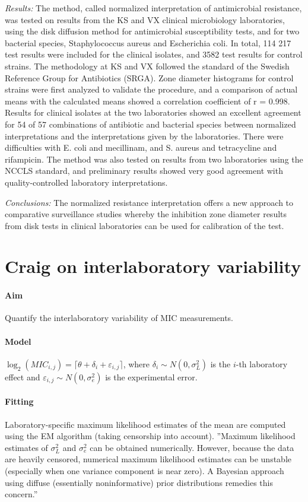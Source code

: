 \documentclass[a4paper]{article}
\begin{document}
\emph{Results:} The method, called normalized interpretation of antimicrobial resistance, was tested on results from the KS and VX clinical microbiology laboratories, using the disk diffusion method for antimicrobial susceptibility tests, and for two bacterial species, Staphylococcus aureus and Escherichia coli. In total, 114 217 test results were included for the clinical isolates, and 3582 test results for control strains. The methodology at KS and VX followed the standard of the Swedish Reference Group for Antibiotics (SRGA). Zone diameter histograms for control strains were first analyzed to validate the procedure, and a comparison of actual means with the calculated means showed a correlation coefficient of r = 0.998. Results for clinical isolates at the two laboratories showed an excellent agreement for 54 of 57 combinations of antibiotic and bacterial species between normalized interpretations and the interpretations given by the laboratories. There were difficulties with E. coli and mecillinam, and S. aureus and tetracycline and rifampicin. The method was also tested on results from two laboratories using the NCCLS standard, and preliminary results showed very good agreement with quality-controlled laboratory interpretations.

\emph{Conclusions:} The normalized resistance interpretation offers a new approach to comparative surveillance studies whereby the inhibition zone diameter results from disk tests in clinical laboratories can be used for calibration of the test.



\section{Craig on interlaboratory variability \cite{Annis2005b}}
\paragraph{Aim} Quantify the interlaboratory variability of MIC measurements.
\paragraph{Model} $\log_2(MIC_{i,j})=\lceil\theta+\delta_i+\varepsilon_{i,j}\rceil$, where $\delta_i\sim N(0,\sigma_L^2)$ is the $i$-th laboratory effect and $\varepsilon_{i,j}\sim N(0,\sigma_e^2)$ is the experimental error.
\paragraph{Fitting} Laboratory-specific maximum likelihood estimates of the mean are computed using the EM algorithm (taking censorship into account). ''Maximum likelihood estimates of $\sigma_L^2$ and $\sigma_e^2$ can be obtained numerically. However, because the data are heavily censored, numerical maximum likelihood estimates can be unstable (especially when one variance component is near zero). A Bayesian approach using diffuse (essentially noninformative) prior distributions remedies this concern.''
\end{document}
